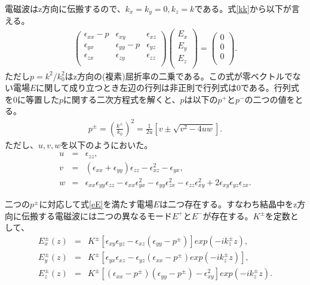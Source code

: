 \documentclass[11pt,a4paper]{jsarticle}
\begin{document}
電磁波はz方向に伝搬するので、$k_x=k_y=0, k_z=k$である。式\ref{kk}から以下が言える。
\begin{eqnarray}
\label{eE}
\left(
    \begin{array}{ccc}
      \epsilon_{xx}-p & \epsilon_{xy} & \epsilon_{xz} \\
      \epsilon_{yx} &  \epsilon_{yy} -p & \epsilon_{yz} \\
      \epsilon_{zx} & \epsilon_{zy} & \epsilon_{zz} \\
    \end{array}
\right)
\left( \begin{array}{c} E_x\\ E_y\\ E_z \\ \end{array} \right)
=\left( \begin{array}{c} 0\\ 0\\ 0 \\ \end{array} \right).
\end{eqnarray}
ただし$p=k^2/k_0^2$はz方向の(複素)屈折率の二乗である。この式が零ベクトルでない電場$E$に関して成り立つとき左辺の行列は非正則で行列式は0である。行列式を0に等置した$p$に関する二次方程式を解くと、$p$は以下の$p^+$と$p^-$の二つの値をとる。
\begin{eqnarray}
p^\pm = (\frac{k^\pm}{k_0})^2 =\frac{1}{2u}[v \pm \sqrt{v^2-4uw}].
\end{eqnarray}
ただし、$u,v,w$を以下のようにおいた。
\begin{eqnarray}
u &=& \epsilon_{zz},\\
v &=& (\epsilon_{xx}+\epsilon_{yy})\epsilon_{zz} -\epsilon_{xz}^2-\epsilon_{yx},\\
w &=& \epsilon_{xx}\epsilon_{yy}\epsilon_{zz}-\epsilon_{xx}\epsilon_{yx}^2-\epsilon_{yy}\epsilon_{zx}^2 -\epsilon_{zz}\epsilon_{xy}^2 +2\epsilon_{xy}\epsilon_{yz}\epsilon_{zx}.
\end{eqnarray}

二つの$p^\pm$に対応して式\ref{eE}を満たす電場$E$は二つ存在する。すなわち結晶中をz方向に伝搬する電磁波には二つの異なるモード$E^+$と$E^-$が存在する。$K^\pm$を定数として、
\begin{eqnarray}
E_x^\pm(z) &=& K^\pm [\epsilon_{xy} \epsilon_{yz}- \epsilon_{xz}(\epsilon_{yy}-p^\pm)]exp(-ik^\pm_zz),\\
E_y^\pm(z) &=& K^\pm [\epsilon_{yx} \epsilon_{xz}- \epsilon_{yz}(\epsilon_{xx}-p^\pm)exp(-ik^\pm_zz)],\\
E_z^\pm(z) &=& K^\pm [(\epsilon_{xx}-p^\pm) (\epsilon_{yy}-p^\pm) -\epsilon_{xy}^2]exp(-ik^\pm_zz).
\end{eqnarray}
\end{document}
